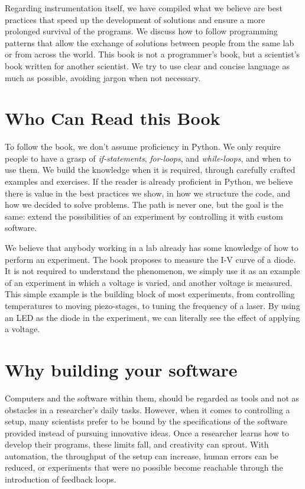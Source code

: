 Regarding instrumentation itself, we have compiled what we believe are best practices that speed up the development of solutions and ensure a more prolonged survival of the programs. We discuss how to follow programming patterns that allow the exchange of solutions between people from the same lab or from across the world. This book is not a programmer's book, but a scientist's book written for another scientist. We try to use clear and concise language as much as possible, avoiding jargon when not necessary.

\section{Who Can Read this Book}\label{sec:who-can-read-this-book}
To follow the book, we don't assume proficiency in Python. We only require people to have a grasp of \textit{if-statements}, \textit{for-loops}, and \textit{while-loops}, and when to use them. We build the knowledge when it is required, through carefully crafted examples and exercises. If the reader is already proficient in Python, we believe there is value in the best practices we show, in how we structure the code, and how we decided to solve problems. The path is never one, but the goal is the same: extend the possibilities of an experiment by controlling it with custom software.

We believe that anybody working in a lab already has some knowledge of how to perform an experiment. The book proposes to measure the I-V curve of a diode. It is not required to understand the phenomenon, we simply use it as an example of an experiment in which a voltage is varied, and another voltage is measured. This simple example is the building block of most experiments, from controlling temperatures to moving piezo-stages, to tuning the frequency of a laser. By using an LED as the diode in the experiment, we can literally see the effect of applying a voltage.

\section{Why building your software}\label{sec:why-building-your-software}
Computers and the software within them, should be regarded as tools and not as obstacles in a researcher's daily tasks. However, when it comes to controlling a setup, many scientists prefer to be bound by the specifications of the software provided instead of pursuing innovative ideas. Once a researcher learns how to develop their programs, these limits fall, and creativity can sprout. With automation, the throughput of the setup can increase, human errors can be reduced, or experiments that were no possible become reachable through the introduction of feedback loops.

